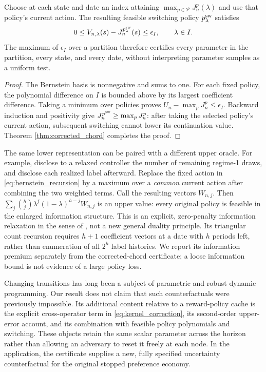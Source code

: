 \begin{corollary}
\label{cor:kernel_reuse}
Choose at each state and date an index attaining $\max_{p\in\mathcal P}J_n^p(\lambda)$ and use that policy's current action. The resulting feasible switching policy $p^{\rm sw}_\lambda$ satisfies
\begin{equation}
 0\leq V_{n,\lambda}(s)-J_n^{p^{\rm sw}_\lambda}(s)
 \leq\epsilon_I,\qquad \lambda\in I.
 \label{eq:kernel_reuse_guarantee}
\end{equation}
The maximum of $\epsilon_I$ over a partition therefore certifies every parameter in the partition, every state, and every date, without interpreting parameter samples as a uniform test.
\end{corollary}
\begin{proof}
The Bernstein basis is nonnegative and sums to one. For each fixed policy, the polynomial difference on $I$ is bounded above by its largest coefficient difference. Taking a minimum over policies proves
$U_n-\max_pJ_n^p\leq\epsilon_I$. Backward induction and positivity give
$J_n^{p^{\rm sw}}\geq\max_pJ_n^p$: after taking the selected policy's current action, subsequent switching cannot lower its continuation value. Theorem \ref{thm:corrected_chord} completes the proof.
\end{proof}

The same lower representation can be paired with a different upper oracle. For example, disclose to a relaxed controller the number of remaining regime-1 draws, and disclose each realized label afterward. Replace the fixed action in \eqref{eq:bernstein_recursion} by a maximum over a \emph{common} current action after combining the two weighted terms. Call the resulting vectors $W_{n,j}$. Then
$\sum_j{h\choose j}\lambda^j(1-\lambda)^{h-j}W_{n,j}$ is an upper value: every original policy is feasible in the enlarged information structure. This is an explicit, zero-penalty information relaxation in the sense of \citet{brown2010}, not a new general duality principle. Its triangular count recursion requires $h+1$ coefficient vectors at a date with $h$ periods left, rather than enumeration of all $2^h$ label histories. We report its information premium separately from the corrected-chord certificate; a loose information bound is not evidence of a large policy loss.

Changing transitions has long been a subject of parametric and robust dynamic programming. Our result does not claim that such counterfactuals were previously impossible. Its additional content relative to a reward-policy cache is the explicit cross-operator term in \eqref{eq:kernel_correction}, its second-order upper-error account, and its combination with feasible policy polynomials and switching. These objects retain the same scalar parameter across the horizon rather than allowing an adversary to reset it freely at each node. In the application, the certificate supplies a new, fully specified uncertainty counterfactual for the original stopped preference economy.
